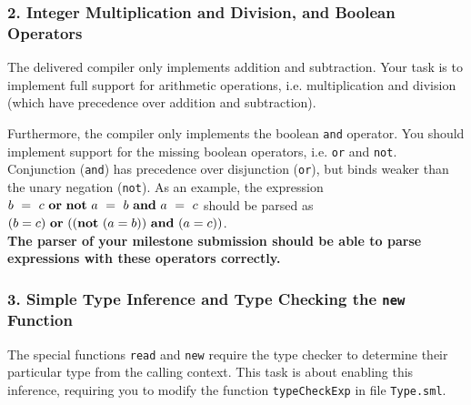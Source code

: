 \documentclass[12pt,a4paper]{article}
\begin{document}
{\subsubsection*
  {2. Integer Multiplication and Division, and Boolean Operators}

The delivered compiler only implements addition and subtraction.
Your task is to implement full support for arithmetic operations, i.e.
multiplication and division (which have precedence over addition and
subtraction).

Furthermore, the compiler only implements the boolean \texttt{and} operator.
You should implement support for the missing boolean operators,
i.e. \texttt{or} and \texttt{not}. Conjunction (\texttt{and}) has precedence
over disjunction (\texttt{or}), but binds weaker than the unary negation
(\texttt{not}).
As an example, the expression
$ b\ =\ c \ \keyw{or}\ \keyw{not} \ a\ =\ b\ \keyw{and}\ a\ =\ c$%
should be parsed as %
$ (b=c)\ \keyw{or}\ ((\keyw{not} \ (a = b))\ \keyw{and}\ (a =c))$.
\\[1ex]
\textbf{The parser of your milestone submission should be able to parse
expressions with these operators correctly.}

\subsubsection*{3. Simple Type Inference and Type Checking the \texttt{new} Function}

The special functions \texttt{read} and \texttt{new} require the type checker
to determine their particular type from the calling context. This task is
about enabling this inference, requiring you to modify the function
\texttt{typeCheckExp} in file \texttt{Type.sml}.

}
\end{document}

